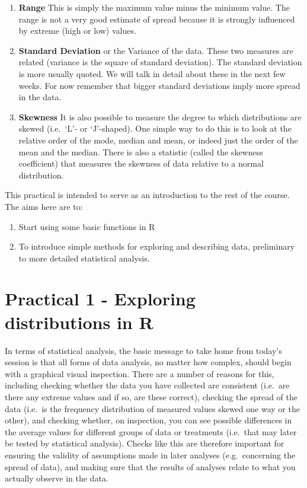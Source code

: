 \documentclass[
]{book}
\begin{document}
\begin{enumerate}
\def\labelenumi{\arabic{enumi})}
\item
  \textbf{Range} This is simply the maximum value minus the minimum value. The range is not a very good estimate of spread because it is strongly influenced by extreme (high or low) values.
\item
  \textbf{Standard Deviation} or the Variance of the data. These two measures are related (variance is the square of standard deviation). The standard deviation is more usually quoted. We will talk in detail about these in the next few weeks. For now remember that bigger standard deviations imply more spread in the data.
\item
  \textbf{Skewness} It is also possible to measure the degree to which distributions are skewed (i.e.~`L'- or `J'-shaped). One simple way to do this is to look at the relative order of the mode, median and mean, or indeed just the order of the mean and the median. There is also a statistic (called the skewness coefficient) that measures the skewness of data relative to a normal distribution.
\end{enumerate}

This practical is intended to serve as an introduction to the rest of the course. The aims here are to:

\begin{enumerate}
\def\labelenumi{\arabic{enumi})}
\item
  Start using some basic functions in R
\item
  To introduce simple methods for exploring and describing data, preliminary to more detailed statistical analysis.
\end{enumerate}

\hypertarget{practical-1---exploring-distributions-in-r}{%
\section{Practical 1 - Exploring distributions in R}\label{practical-1---exploring-distributions-in-r}}

In terms of statistical analysis, the basic message to take home from today's session is that all forms of data analysis, no matter how complex, should begin with a graphical visual inspection. There are a number of reasons for this, including checking whether the data you have collected are consistent (i.e.~are there any extreme values and if so, are these correct), checking the spread of the data (i.e.~is the frequency distribution of measured values skewed one way or the other), and checking whether, on inspection, you can see possible differences in the average values for different groups of data or treatments (i.e.~that may later be tested by statistical analysis). Checks like this are therefore important for ensuring the validity of assumptions made in later analyses (e.g.~concerning the spread of data), and making sure that the results of analyses relate to what you actually observe in the data.
\end{document}

